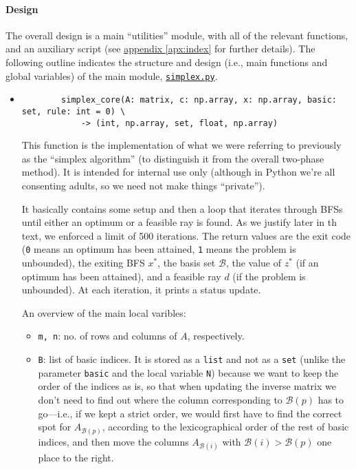 \documentclass[a4paper]{article}
\begin{document}
\paragraph{Design} The overall design is a main ``utilities'' module, with all of the relevant functions, and an auxiliary script (see \hyperref[apx:index]{appendix \ref{apx:index}} for further details). The following outline indicates the structure and design (i.e., main functions and global variables) of the {main module}, \href{run:./simplex.py}{\texttt{simplex.py}}. 
\begin{itemize}
    \item 
    \begin{verbatim}
        simplex_core(A: matrix, c: np.array, x: np.array, basic: set, rule: int = 0) \
            -> (int, np.array, set, float, np.array)
    \end{verbatim}
    This function is the implementation of what we were referring to previously as the ``simplex algorithm'' (to distinguish it from the overall two-phase method). It is intended for internal use only (although in Python we're all consenting adults, so we need not make things ``private'').
    
    It basically contains some setup and then a loop that iterates through BFSs until either an optimum or a feasible ray is found. As we justify later in th text, we enforced a limit of 500 iterations. The return values are the exit code (\texttt{0} means an optimum has been attained, \texttt{1} means the problem is unbounded), the exiting BFS $x^\ast$, the basis set $\mathcal{B}$, the value of $z^\ast$ (if an optimum has been attained), and a feasible ray $d$ (if the problem is unbounded). At each iteration, it prints a status update.
    
    An overview of the main local varibles:
    \begin{itemize}
        \item \texttt{m, n}: no. of rows and columns of $A$, respectively.
        \item \texttt{B}: list of basic indices. It is stored as a \texttt{list} and not as a \texttt{set} (unlike the parameter \texttt{basic} and the local variable \texttt{N}) because we want to keep the order of the indices as is, so that when updating the inverse matrix we don't need to find out where the column corresponding to $\mathcal{B}(p)$ has to go---i.e., if we kept a strict order, we would first have to find the correct spot for $A_{\mathcal{B}(p)}$, according to the lexicographical order of the rest of basic indices, and then move the columns $A_{\mathcal{B}(i)}$ with $\mathcal{B}(i) > \mathcal{B}(p)$ one place to the right.
        

\end{itemize}
\end{itemize}
\end{document}
